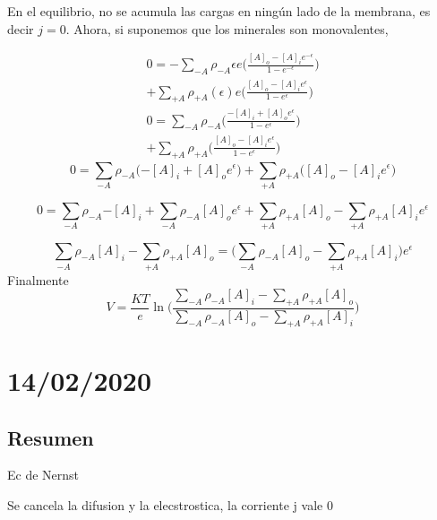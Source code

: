 En el equilibrio, no se acumula las cargas en ningún lado de la membrana, es decir $j=0$. Ahora, si suponemos que los minerales son monovalentes, 

\begin{align*}
	0 = -\sum_{-A} \rho_{-A}\epsilon e \bigg(\frac{[A]_o - [A]_i e^{-\epsilon}}{1 - e^{-\epsilon} }\bigg) \\ + \sum_{+A} \rho_{+A} (\epsilon)e \bigg(\frac{[A]_o - [A]_i e^{\epsilon}}{1 - e^{\epsilon} }\bigg) \\
	0 = \sum_{-A} \rho_{-A} \bigg(\frac{-[A]_i + [A]_o e^{\epsilon}}{1 - e^{\epsilon} }\bigg) \\ 
	+ \sum_{+A} \rho_{+A} \bigg(\frac{[A]_o - [A]_i e^{\epsilon}}{1 - e^{\epsilon} }\bigg)
\end{align*}
\begin{equation*}
			0 = \sum_{-A} \rho_{-A} \bigg({-[A]_i + [A]_o e^{\epsilon}}\bigg) + \sum_{+A} \rho_{+A} \bigg({[A]_o - [A]_i e^{\epsilon}}\bigg)
\end{equation*}



\begin{equation*}
			0 = \sum_{-A} \rho_{-A} {-[A]_i + \sum_{-A} \rho_{-A}[A]_o e^{\epsilon}} + \sum_{+A} \rho_{+A}{[A]_o - \sum_{+A} \rho_{+A} [A]_i e^{\epsilon}}
\end{equation*}


\begin{equation*}
			\sum_{-A} \rho_{-A} {[A]_i -  \sum_{+A} \rho_{+A}[A]_o = ( \sum_{-A} \rho_{-A}[A]_o }  - \sum_{+A} \rho_{+A} [A]_i )e^{\epsilon}
\end{equation*}
Finalmente
\begin{equation}
	V = \frac{KT}{e} \ln\bigg( \frac{\sum_{-A} \rho_{-A} [A]_i -  \sum_{+A} \rho_{+A}[A]_o }{ \sum_{-A} \rho_{-A}[A]_o   - \sum_{+A} \rho_{+A} [A]_i} \bigg)
	\label{eq:jasuma}
\end{equation}




\section{14/02/2020}

\subsection{Resumen}

Ec de Nernst

Se cancela la difusion y la elecstrostica, la corriente j vale 0


